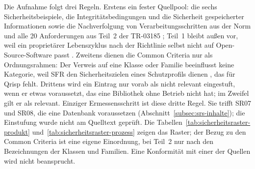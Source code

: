 \documentclass[11pt,a4paper]{report}
\begin{document}
Die Aufnahme folgt drei Regeln. Erstens ein fester Quellpool: die sechs
Sicherheitsbeispiele, die Integritätsbedingungen und die Sicherheit
gespeicherter Informationen sowie die Nachverfolgung von
Verarbeitungsschritten aus der Norm \cite[Abschn.~9.6.15\,e--f,
9.6.17\,d und 9.6.18\,c]{iso29148} und alle 20 Anforderungen aus Teil~2
der TR-03185 \cite[Abschn.~2.3]{bsitr03185}; Teil~1 bleibt außen vor,
weil ein proprietärer Lebenszyklus nach der Richtlinie selbst nicht auf
Open-Source-Software passt \cite[Abschn.~2.1]{bsitr03185}. Zweitens
dienen die Common Criteria nur als Ordnungsrahmen: Der Verweis auf eine
Klasse oder Familie beeinflusst keine Kategorie, weil SFR den
Sicherheitszielen eines Schutzprofils dienen
\cite[Einleitung]{cc2022teil2}, das für Qrisp fehlt. Drittens wird ein
Eintrag nur vorab als nicht relevant eingestuft, wenn er etwas
voraussetzt, das eine Bibliothek ohne Betrieb nicht hat; im Zweifel
gilt er als relevant. Einziger Ermessensschritt ist diese dritte Regel.
Sie trifft SR07 und SR08, die eine Datenbank voraussetzen
(Abschnitt~\ref{subsec:srs-inhalte}); die Einstufung wurde nicht am
Quelltext geprüft. Die Tabellen~\ref{tab:sicherheitsraster-produkt}
und~\ref{tab:sicherheitsraster-prozess} zeigen das Raster; der Bezug zu den Common Criteria ist eine eigene Einordnung,
bei Teil~2 nur nach den Bezeichnungen der Klassen und Familien. Eine
Konformität mit einer der Quellen wird nicht beansprucht.
\end{document}

